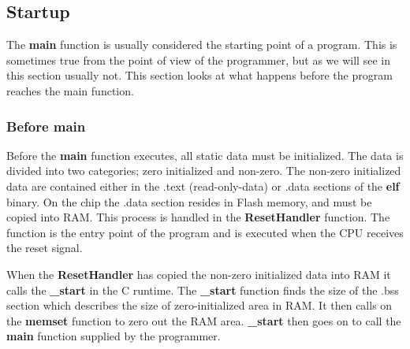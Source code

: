\subsection{Startup}

The \textbf{main} function is usually considered the starting point of a program.
This is sometimes true from the point of view of the programmer, but as we will see in this section usually not.
This section looks at what happens before the program reaches the main function.

\subsubsection{Before main}

Before the \textbf{main} function executes, all static data must be initialized.
The data is divided into two categories; zero initialized and non-zero.
The non-zero initialized data are contained either in the .text (read-only-data) or .data sections of the \textbf{elf} binary.
On the chip the .data section resides in Flash memory, and must be copied into RAM.
This process is handled in the \textbf{ResetHandler} function.
The function is the entry point of the program and is executed when the CPU receives the reset signal.

When the \textbf{ResetHandler} has copied the non-zero initialized data into RAM it calls the \textbf{\_start} in the C runtime.
The \textbf{\_start} function finds the size of the .bss section which describes the size of zero-initialized area in RAM.
It then calls on the \textbf{memset} function to zero out the RAM area.
\textbf{\_start} then goes on to call the \textbf{main} function supplied by the programmer. 
